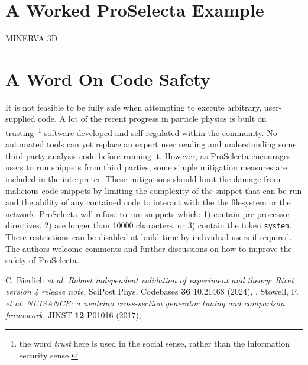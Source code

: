 \documentclass{SciPost}
\newcommand{\proselecta}{{\sc ProSelecta}}
\begin{document}
\begin{appendix}

\section{A Worked \proselecta{} Example}
MINERVA 3D

\section{A Word On Code Safety}

It is not feasible to be fully safe when attempting to execute arbitrary, user-supplied code. A lot of the recent progress in particle physics is built on trusting~\footnote{the word \textit{trust} here is used in the social sense, rather than the information security sense.} software developed and self-regulated within the community. No automated tools can yet replace an expert user reading and understanding some third-party analysis code before running it. However, as \proselecta{} encourages users to run snippets from third parties, some simple mitigation measures are included in the interpreter. These mitigations should limit the damage from malicious code snippets by limiting the complexity of the snippet that can be run and the ability of any contained code to interact with the the filesystem or the network. \proselecta{} will refuse to run snippets which: 1) contain pre-processor directives, 2) are longer than 10000 characters, or 3) contain the token \texttt{system}. These restrictions can be disabled at build time by individual users if required. The authors welcome comments and further discussions on how to improve the safety of \proselecta{}.

\end{appendix}





\begin{thebibliography}{99}
 C. Bierlich {\it et al.} {\it Robust independent validation of experiment and theory: Rivet version 4 release note}, SciPost Phys. Codebases {\bf 36} 10.21468 (2024), .
 Stowell, P. {\it et al.} {\it NUISANCE: a neutrino cross-section generator tuning and comparison framework}, JINST {\bf 12} P01016 (2017), .

\end{thebibliography}
\end{document}
